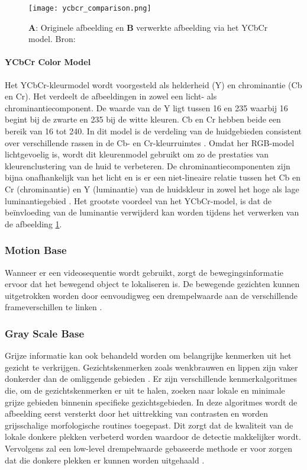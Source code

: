 \begin{figure}[htbp]
    \centering
    \texttt{[image: ycbcr\_comparison.png]}
    \caption{\textbf{A}: Originele afbeelding en \textbf{B} verwerkte afbeelding via het YCbCr model. Bron: \autocite{Kumar2019}}
    \label{fig:ycbcrfig}
\end{figure}
\paragraph{YCbCr Color Model}
Het YCbCr-kleurmodel wordt voorgesteld als helderheid (Y) en chrominantie (Cb en Cr). Het verdeelt de afbeeldingen in zowel een licht- als chrominantiecomponent. De waarde van de Y ligt tussen 16 en 235 waarbij 16 begint bij de zwarte en 235 bij de witte kleuren. Cb en Cr hebben beide een bereik van 16 tot 240. In dit model is de verdeling van de huidgebieden consistent over verschillende rassen in de Cb- en Cr-kleurruimtes \autocite{Zhu2012a, Zhu2012b}. Omdat her RGB-model lichtgevoelig is, wordt dit kleurenmodel gebruikt om zo de prestaties van kleurenclustering van de huid te verbeteren. De chrominantiecomponenten zijn bijna onafhankelijk van het licht en is er een niet-lineaire relatie tussen het Cb en Cr (chrominantie) en Y (luminantie) van de huidskleur in zowel het hoge als lage luminantiegebied  \autocite{agui1992}. Het grootste voordeel van het YCbCr-model, is dat de beïnvloeding van de luminantie verwijderd kan worden tijdens het verwerken van de afbeelding \autocite{Kumar2019} \ref{fig:ycbcrfig}.

\subsubsection{Motion Base}
Wanneer er een videosequentie wordt gebruikt, zorgt de bewegingsinformatie ervoor dat het bewegend object te lokaliseren is. De bewegende gezichten kunnen uitgetrokken worden door eenvoudigweg een drempelwaarde aan de verschillende frameverschillen te linken \autocite{HJELMAS}.

\subsubsection{Gray Scale Base}
Grijze informatie kan ook behandeld worden om belangrijke kenmerken uit het gezicht te verkrijgen. Gezichtskenmerken zoals wenkbrauwen en lippen zijn vaker donkerder dan de omliggende gebieden \autocite{COOTES1992}. Er zijn verschillende kenmerkalgoritmes die, om de gezichtskenmerken er uit te halen, zoeken naar lokale en minimale grijze gebieden binnenin specifieke gezichtsgebieden. In deze algoritmes wordt de afbeelding eerst versterkt door het uittrekking van contrasten en worden grijsschalige morfologische routines toegepast. Dit zorgt dat de kwaliteit van de lokale donkere plekken verbeterd worden waardoor de detectie makkelijker wordt. Vervolgens zal een low-level drempelwaarde gebaseerde methode er voor zorgen dat die donkere plekken er kunnen worden uitgehaald \autocite{HJELMAS}.

